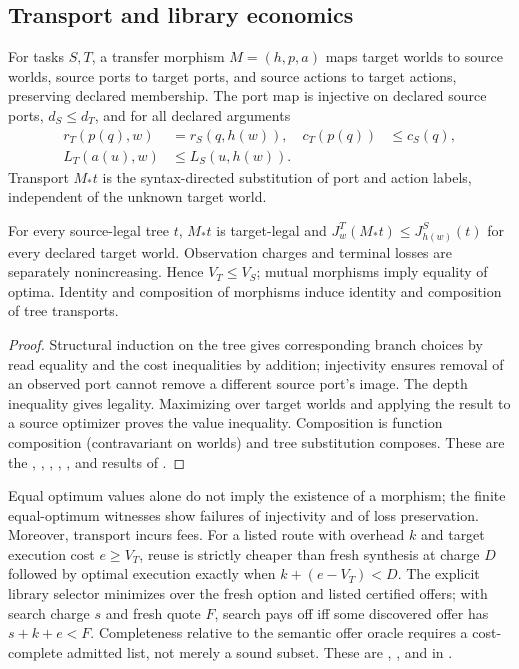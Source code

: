 \subsection{Transport and library economics}
For tasks $S,T$, a transfer morphism $M=(h,p,a)$ maps target worlds to source worlds, source ports to target ports, and source actions to target actions, preserving declared membership. The port map is injective on declared source ports, $d_S\le d_T$, and for all declared arguments
\begin{align*}
 r_T(p(q),w)&=r_S(q,h(w)), & c_T(p(q))&\le c_S(q),\\
 L_T(a(u),w)&\le L_S(u,h(w)).
\end{align*}
Transport $M_*t$ is the syntax-directed substitution of port and action labels, independent of the unknown target world.
\begin{theorem}\label{thm:transfer}
For every source-legal tree $t$, $M_*t$ is target-legal and $J^T_w(M_*t)\le J^S_{h(w)}(t)$ for every declared target world. Observation charges and terminal losses are separately nonincreasing. Hence $V_T\le V_S$; mutual morphisms imply equality of optima. Identity and composition of morphisms induce identity and composition of tree transports.
\end{theorem}
\begin{proof}
Structural induction on the tree gives corresponding branch choices by read equality and the cost inequalities by addition; injectivity ensures removal of an observed port cannot remove a different source port's image. The depth inequality gives legality. Maximizing over target worlds and applying the result to a source optimizer proves the value inequality. Composition is function composition (contravariant on worlds) and tree substitution composes. These are the , , , , , and  results of .
\end{proof}
Equal optimum values alone do not imply the existence of a morphism; the finite equal-optimum witnesses show failures of injectivity and of loss preservation. Moreover, transport incurs fees. For a listed route with overhead $k$ and target execution cost $e\ge V_T$, reuse is strictly cheaper than fresh synthesis at charge $D$ followed by optimal execution exactly when $k+(e-V_T)<D$. The explicit library selector minimizes over the fresh option and listed certified offers; with search charge $s$ and fresh quote $F$, search pays off iff some discovered offer has $s+k+e<F$. Completeness relative to the semantic offer oracle requires a cost-complete admitted list, not merely a sound subset. These are , , and  in .

